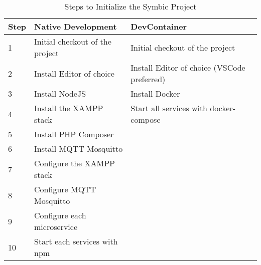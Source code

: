 \begin{table}
  \centering
  \begin{tabular}{@{}lll@{}}
    \cellcolor[HTML]{FFFFFF}\textbf{Step} & \cellcolor[HTML]{FFFFFF}\textbf{Native Development}     & \cellcolor[HTML]{FFFFFF}\textbf{DevContainer}                           \\ \midrule\midrule
    \cellcolor[HTML]{DDDDDD}1  & \cellcolor[HTML]{0D8120}Initial checkout of the project & \cellcolor[HTML]{0D8120}Initial checkout of the project      \\
    \cellcolor[HTML]{DDDDDD}2  & \cellcolor[HTML]{DDDDDD}Install Editor of choice                   & \cellcolor[HTML]{DDDDDD}Install Editor of choice (\ac{VSCode} preferred)\\
    \cellcolor[HTML]{DDDDDD}3  & \cellcolor[HTML]{DDDDDD}Install NodeJS                             & \cellcolor[HTML]{DDDDDD}Install Docker                                  \\
    \cellcolor[HTML]{DDDDDD}4  & \cellcolor[HTML]{DDDDDD}Install the \ac{XAMPP} stack               & \cellcolor[HTML]{0D8120}Start all services with docker-compose          \\
    \cellcolor[HTML]{DDDDDD}5  & \cellcolor[HTML]{DDDDDD}Install PHP Composer                       & \cellcolor[HTML]{DDDDDD}                                                \\
    \cellcolor[HTML]{DDDDDD}6  & \cellcolor[HTML]{DDDDDD}Install MQTT Mosquitto                     & \cellcolor[HTML]{DDDDDD}                                                \\
    \cellcolor[HTML]{DDDDDD}7  & \cellcolor[HTML]{DDDDDD}Configure the \ac{XAMPP} stack             & \cellcolor[HTML]{DDDDDD}                                                \\
    \cellcolor[HTML]{DDDDDD}8  & \cellcolor[HTML]{DDDDDD}Configure MQTT Mosquitto                   & \cellcolor[HTML]{DDDDDD}                                                \\
    \cellcolor[HTML]{DDDDDD}9  & \cellcolor[HTML]{DDDDDD}Configure each microservice                & \cellcolor[HTML]{DDDDDD}                                                \\
    \cellcolor[HTML]{DDDDDD}10 & \cellcolor[HTML]{0D8120}Start each services with npm               & \cellcolor[HTML]{DDDDDD}                                                \\
  \end{tabular}
  \caption{Steps to Initialize the Symbic Project}\label{tab::init_steps}
\end{table}